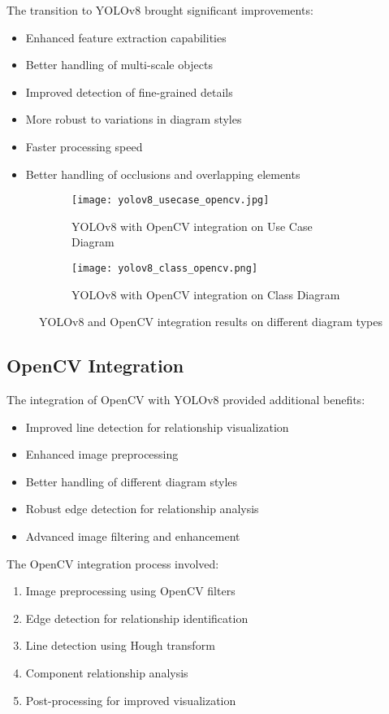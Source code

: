 \documentclass[conference]{IEEEtran}
\begin{document}
The transition to YOLOv8 brought significant improvements:
\begin{itemize}
\item Enhanced feature extraction capabilities
\item Better handling of multi-scale objects
\item Improved detection of fine-grained details
\item More robust to variations in diagram styles
\item Faster processing speed
\item Better handling of occlusions and overlapping elements
\end{itemize}

\begin{figure}[H]
\centering
\begin{subfigure}{.3\textwidth}
  \centering
  \texttt{[image: yolov8\_usecase\_opencv.jpg]}
  \caption{YOLOv8 with OpenCV integration on Use Case Diagram}
  \label{fig:yolov8_usecase}
\end{subfigure}
\begin{subfigure}{.3\textwidth}
  \centering
  \texttt{[image: yolov8\_class\_opencv.png]}
  \caption{YOLOv8 with OpenCV integration on Class Diagram}
  \label{fig:yolov8_class}
\end{subfigure}
\caption{YOLOv8 and OpenCV integration results on different diagram types}
\label{fig:yolov8_results}
\end{figure}

\subsection{OpenCV Integration}
The integration of OpenCV with YOLOv8 provided additional benefits:
\begin{itemize}
\item Improved line detection for relationship visualization
\item Enhanced image preprocessing
\item Better handling of different diagram styles
\item Robust edge detection for relationship analysis
\item Advanced image filtering and enhancement
\end{itemize}

The OpenCV integration process involved:
\begin{enumerate}
\item Image preprocessing using OpenCV filters
\item Edge detection for relationship identification
\item Line detection using Hough transform
\item Component relationship analysis
\item Post-processing for improved visualization
\end{enumerate}
\end{document}
